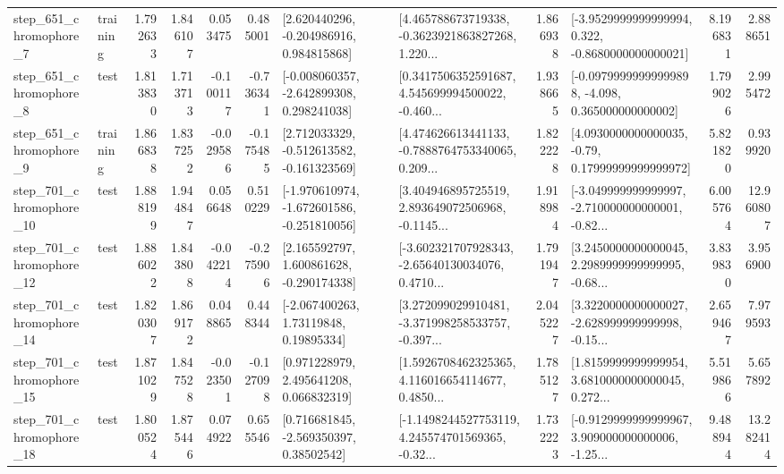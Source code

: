 \begin{tabular}{llrrrrllrlrr}
   step\_651\_chromophore\_7 &  training &      1.792633 &    1.846107 &      0.053475 &  0.485001 &    [2.620440296, -0.204986916, 0.984815868] &  [4.465788673719338, -0.3623921863827268, 1.220... &       1.866938 &  [-3.9529999999999994, 0.322, -0.8680000000000021] &            8.196831 &          2.888651 \\
   step\_651\_chromophore\_8 &      test &      1.813830 &    1.713713 &     -0.100117 & -0.736341 &   [-0.008060357, -2.642899308, 0.298241038] &  [0.3417506352591687, 4.545699994500022, -0.460... &       1.938665 &  [-0.09799999999999898, -4.098, 0.365000000000002] &            1.799026 &          2.995472 \\
   step\_651\_chromophore\_9 &  training &      1.866838 &    1.837252 &     -0.029586 & -0.175485 &   [2.712033329, -0.512613582, -0.161323569] &  [4.474626613441133, -0.7888764753340065, 0.209... &       1.822228 &   [4.0930000000000035, -0.79, 0.17999999999999972] &            5.821820 &          0.939920 \\
  step\_701\_chromophore\_10 &      test &      1.888199 &    1.944847 &      0.056648 &  0.510229 &  [-1.970610974, -1.672601586, -0.251810056] &  [3.404946895725519, 2.893649072506968, -0.1145... &       1.918984 &  [-3.049999999999997, -2.710000000000001, -0.82... &            6.005764 &         12.960807 \\
  step\_701\_chromophore\_12 &      test &      1.886022 &    1.843808 &     -0.042214 & -0.275906 &    [2.165592797, 1.600861628, -0.290174338] &  [-3.602321707928343, -2.65640130034076, 0.4710... &       1.791947 &  [3.2450000000000045, 2.2989999999999995, -0.68... &            3.839830 &          3.956900 \\
  step\_701\_chromophore\_14 &      test &      1.820307 &    1.869172 &      0.048865 &  0.448344 &      [-2.067400263, 1.73119848, 0.19895334] &  [3.272099029910481, -3.371998258533757, -0.397... &       2.045227 &  [3.3220000000000027, -2.628999999999998, -0.15... &            2.659467 &          7.979593 \\
  step\_701\_chromophore\_15 &      test &      1.871029 &    1.847528 &     -0.023501 & -0.127098 &     [0.971228979, 2.495641208, 0.066832319] &  [1.5926708462325365, 4.116016654114677, 0.4850... &       1.785127 &  [1.8159999999999954, 3.6810000000000045, 0.272... &            5.519866 &          5.657892 \\
  step\_701\_chromophore\_18 &      test &      1.800524 &    1.875446 &      0.074922 &  0.655546 &     [0.716681845, -2.569350397, 0.38502542] &  [-1.1498244527753119, 4.245574701569365, -0.32... &       1.732223 &  [-0.9129999999999967, 3.909000000000006, -1.25... &            9.488944 &         13.282414 \\

\end{tabular}

